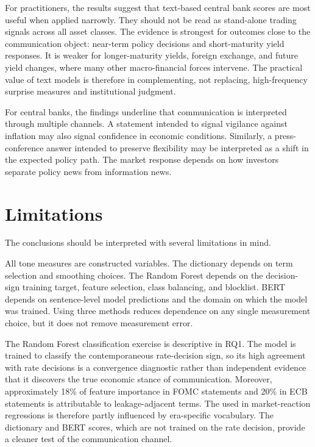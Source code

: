 For practitioners, the results suggest that text-based central bank scores are
most useful when applied narrowly. They should not be read as stand-alone trading
signals across all asset classes. The evidence is strongest for outcomes close
to the communication object: near-term policy decisions and short-maturity yield
responses. It is weaker for longer-maturity yields, foreign exchange, and future
yield changes, where many other macro-financial forces intervene. The practical
value of text models is therefore in complementing, not replacing, high-frequency
surprise measures and institutional judgment.

For central banks, the findings underline that communication is interpreted
through multiple channels. A statement intended to signal vigilance against
inflation may also signal confidence in economic conditions. Similarly, a
press-conference answer intended to preserve flexibility may be interpreted as a
shift in the expected policy path. The market response depends on how investors
separate policy news from information news.

\section{Limitations}
\label{sec:conc_limitations}

The conclusions should be interpreted with several limitations in mind.

All tone measures are constructed variables. The dictionary depends on term
selection and smoothing choices. The Random Forest depends on the decision-sign
training target, feature selection, class balancing, and blocklist. BERT
depends on sentence-level model predictions and the domain on which the model
was trained. Using three methods reduces dependence on any single measurement
choice, but it does not remove measurement error.

The Random Forest classification exercise is descriptive in RQ1. The model is
trained to classify the contemporaneous rate-decision sign, so its high
agreement with rate decisions is a convergence diagnostic rather than independent
evidence that it discovers the true economic stance of communication. Moreover,
approximately 18\% of feature importance in FOMC statements and 20\% in ECB
statements is attributable to leakage-adjacent terms. The \rfscore{} used in
market-reaction regressions is therefore partly influenced by era-specific
vocabulary. The dictionary and BERT scores, which are not trained on the
rate decision, provide a cleaner test of the communication channel.

